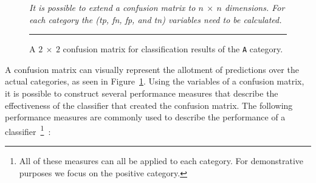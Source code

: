 \begin{figure}[!tb]
  \centering
  \caption{A $2~\times~2$ confusion matrix for classification results of the \texttt{A} category.}
  \vspace{1mm}
  \footnotesize{\emph{It is possible to extend a confusion matrix to $n~\times~n$ dimensions. For each category the (\gls{tp}, \gls{fn}, \gls{fp}, and \gls{tn}) variables need to be calculated.}}
  \vspace{2mm}
  \hrule
  \label{fig:example_confusion_matrix}
\end{figure}

A confusion matrix can visually represent the allotment of predictions over the actual categories, as seen in Figure~\ref{fig:example_confusion_matrix}. Using the variables of a confusion matrix, it is possible to construct several performance measures that describe the effectiveness of the classifier that created the confusion matrix. The following performance measures are commonly used to describe the performance of a classifier~\footnote{All of these measures can all be applied to each category. For demonstrative purposes we focus on the positive category.}~\cite{SJS06}:

